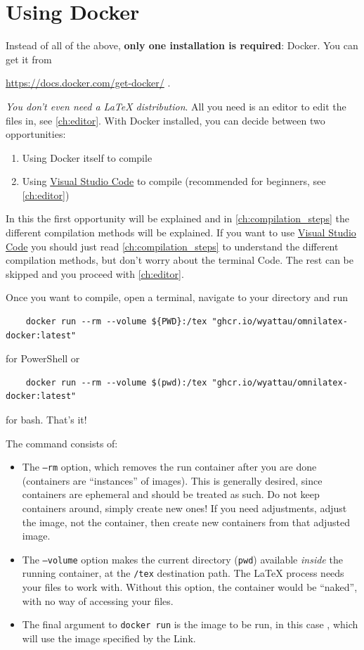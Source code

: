 \section{Using Docker}
\label{ch:using-docker}

Instead of all of the above, \textbf{only one installation is required}: Docker.
You can get it from
\begin{center}
  \url{https://docs.docker.com/get-docker/} .
\end{center}
\emph{You don't even need a \LaTeX{} distribution}.
All you need is an editor to edit the files in, see \cref{ch:editor}.
With Docker installed, you can decide between two opportunities:
\begin{enumerate}
  \item Using Docker itself to compile
  \item Using \href{ch:vsc}{Visual Studio Code} to compile (recommended for beginners, see \cref{ch:editor})
\end{enumerate}
In this  the first opportunity will be explained and in \cref{ch:compilation_steps} the
different compilation methods will be explained. If you want to use \href{ch:vsc}{Visual Studio Code} you should just read \cref{ch:compilation_steps} to understand
the different compilation methods, but don't worry about the terminal Code. The rest can be skipped and you proceed with \cref{ch:editor}.

Once you want to compile, open a terminal, navigate to your directory and run
\begin{verbatim}
    docker run --rm --volume ${PWD}:/tex "ghcr.io/wyattau/omnilatex-docker:latest"
\end{verbatim}
for PowerShell or
\begin{verbatim}
    docker run --rm --volume $(pwd):/tex "ghcr.io/wyattau/omnilatex-docker:latest"
\end{verbatim}
for bash.
That's it!

The command consists of:
\begin{itemize}
  \item The \texttt{--rm} option, which removes the run container after you are done
        (containers are \enquote{instances} of images).
        This is generally desired, since containers are ephemeral and should be treated as such.
        Do not keep containers around, simply create new ones!
        If you need adjustments, adjust the image, not the container, then create new containers
        from that adjusted image.
  \item The \texttt{--volume} option makes the current directory (\texttt{pwd})
        available \emph{inside} the running container, at the \texttt{/tex} destination path.
        The \LaTeX{} process needs your files to work with.
        Without this option, the container would be \enquote{naked}, with no way of
        accessing your files.
  \item The final argument to \texttt{docker run} is the image to be run, in this case
        , which will use the image specified by the Link.
\end{itemize}

